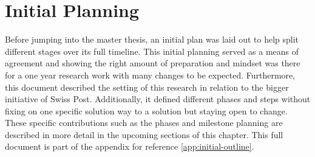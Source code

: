 \section{Initial Planning}
\label{ProjMgmtInitialPlanning}

Before jumping into the master thesis, an initial plan was laid out to help split different stages over its full timeline. This initial planning served as a means of agreement and showing the right amount of preparation and mindset was there for a one year research work with many changes to be expected. Furthermore, this document described the setting of this research in relation to the bigger initiative of Swiss Post. Additionally, it defined different phases and steps without fixing on one specific solution way to a solution but staying open to change. These specific contributions such as the phases and milestone planning are described in more detail in the upcoming sections of this chapter. This full document is part of the appendix for reference \ref{app:initial-outline}.